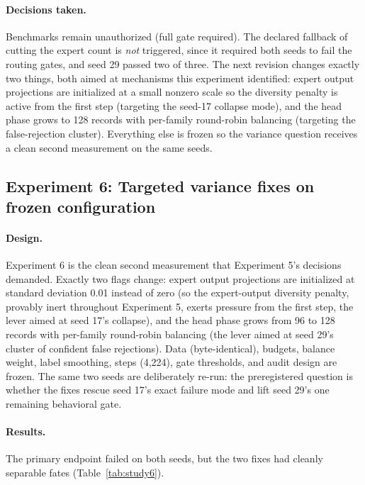 \documentclass[10pt,a4paper]{article}
\begin{document}
\paragraph{Decisions taken.}
Benchmarks remain unauthorized (full gate required). The declared fallback of
cutting the expert count is \emph{not} triggered, since it required both seeds
to fail the routing gates, and seed 29 passed two of three. The next revision
changes exactly two things, both aimed at mechanisms this experiment identified:
expert output projections are initialized at a small nonzero scale so the
diversity penalty is active from the first step (targeting the seed-17
collapse mode), and the head phase grows to 128 records with per-family
round-robin balancing (targeting the false-rejection cluster). Everything
else is frozen so the variance question receives a clean second measurement
on the same seeds.

\subsection{Experiment 6: Targeted variance fixes on frozen configuration}
\label{sec:study6}

\paragraph{Design.}
Experiment 6 is the clean second measurement that Experiment 5's decisions demanded.
Exactly two flags change: expert output projections are initialized at
standard deviation 0.01 instead of zero (so the expert-output diversity
penalty, provably inert throughout Experiment 5, exerts pressure from the first
step, the lever aimed at seed 17's collapse), and the head phase grows
from 96 to 128 records with per-family round-robin balancing (the lever aimed
at seed 29's cluster of confident false rejections). Data (byte-identical),
budgets, balance weight, label smoothing, steps (4,224), gate thresholds, and
audit design are frozen. The same two seeds are deliberately re-run: the
preregistered question is whether the fixes rescue seed 17's exact failure
mode and lift seed 29's one remaining behavioral gate.

\paragraph{Results.}
The primary endpoint failed on both seeds, but the two fixes had cleanly
separable fates (Table~\ref{tab:study6}).
\end{document}
